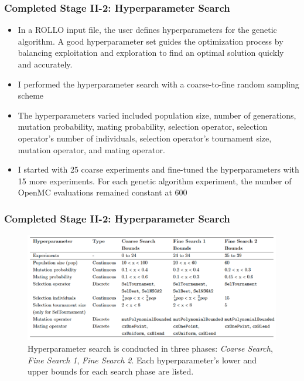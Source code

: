 \begin{frame}
    \frametitle{Completed Stage II-2: Hyperparameter Search}
    \begin{itemize}
        \item In a ROLLO input file, the user defines hyperparameters for the genetic 
        algorithm. A good hyperparameter set guides the optimization process by 
        balancing exploitation and exploration to find an optimal solution quickly 
        and accurately. 
        \item I performed the hyperparameter search with a coarse-to-fine random sampling scheme
        \item The hyperparameters varied included population size, number of generations, 
        mutation probability, mating probability, selection operator, selection operator's 
        number of individuals, selection operator's tournament size, mutation operator, 
        and mating operator.  
        \item I started with 25 coarse experiments and fine-tuned the hyperparameters
        with 15 more experiments. For each genetic algorithm experiment, the number 
        of OpenMC evaluations remained constant at 600
    \end{itemize}
\end{frame}

\begin{frame}
    \frametitle{Completed Stage II-2: Hyperparameter Search}
    \begin{figure}
        \caption{Hyperparameter search is conducted in three phases: \textit{Coarse Search}, 
    \textit{Fine Search 1}, \textit{Fine Search 2}. Each hyperparameter's lower and
    upper bounds for each search phase are listed.}
        \includegraphics[width=0.8\linewidth]{figures/hyperparameter-search.png} 
    \end{figure}
\end{frame}

